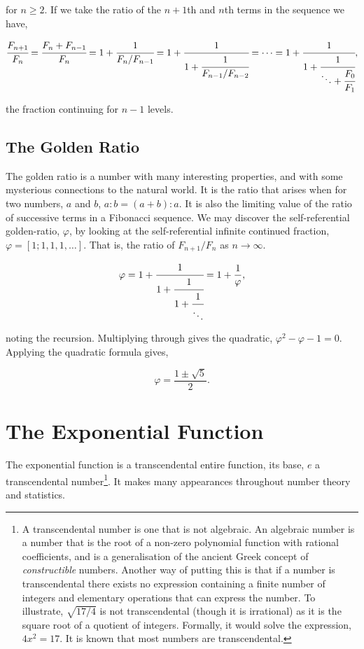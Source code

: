 \documentclass[11pt]{amsart}
\begin{document}
for $n \geq 2$. If we take the ratio of the $n+1$th and $n$th terms in the sequence we have,

$$
\cfrac{F_{n+1}}{F_n}
= \cfrac{F_n + F_{n - 1}}{F_n}
= 1 + \cfrac{1}{F_{n}/F_{n - 1}}
= 1 + \cfrac{1}{1 + \cfrac{1}{F_{n-1}/F_{n - 2}}}
= \cdots
= 1 + \cfrac{1}{1 + \cfrac{1}{\ddots + \cfrac{F_0}{F_1}}},
$$

the fraction continuing for $n - 1$ levels.

\subsection{The Golden Ratio}

The golden ratio is a number with many interesting properties, and with some mysterious connections to the natural world. It is the ratio that arises when for two numbers, $a$ and $b$, $a : b = (a + b) : a$. It is also the limiting value of the ratio of successive terms in a Fibonacci sequence. We may discover the self-referential golden-ratio, $\varphi$, by looking at the self-referential infinite continued fraction, $\varphi = [1; 1, 1, 1, \dots]$. That is, the ratio of $F_{n+1}/F_n$ as $n \to \infty$.

$$
\varphi = 1 + \cfrac{1}{1 + \cfrac{1}{1 + \cfrac{1}{\ddots}}} = 1 + \frac{1}{\varphi},
$$

noting the recursion. Multiplying through gives the quadratic, $\varphi^2 - \varphi - 1 = 0$. Applying the quadratic formula gives,

$$\varphi = \frac{1 \pm \sqrt{5}}{2}.$$

\section{The Exponential Function}

The exponential function is a transcendental entire function, its base, $e$ a transcendental number\footnote{A transcendental number is one that is not algebraic. An algebraic number is a number that is the root of a non-zero polynomial function with rational coefficients, and is a generalisation of the ancient Greek concept of \emph{constructible} numbers. Another way of putting this is that if a number is transcendental there exists no expression containing a finite number of integers and elementary operations that can express the number. To illustrate, $\sqrt{17/4}$ is not transcendental (though it is irrational) as it is the square root of a quotient of integers. Formally, it would solve the expression, $4x^2 = 17$. It is known that most numbers are transcendental.}. It makes many appearances throughout number theory and statistics.
\end{document}
